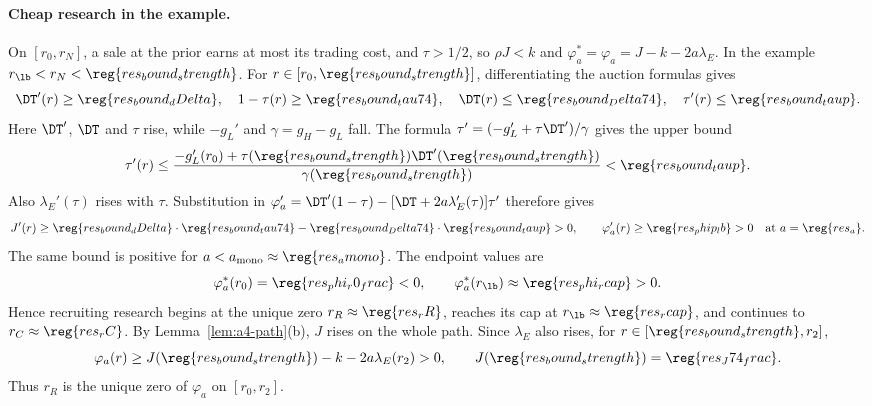 \paragraph{Cheap research in the example.}
On \([r_0,r_N]\), a sale at the prior earns at most its trading cost, and \(\tau>1/2\), so \(\rho J<k\) and
\(\varphi_a^*=\varphi_a=J-k-2a\lambda_E\). In the example \(r_{\lb}<r_N<\reg{res_bound_strength}\).
For \(r\in[r_0,\reg{res_bound_strength}]\), differentiating the auction formulas gives
\[
 \DT'(r)\ge\reg{res_bound_dDelta},\quad
 1-\tau(r)\ge\reg{res_bound_tau74},\quad
 \DT(r)\le\reg{res_bound_Delta74},\quad
 \tau'(r)\le\reg{res_bound_taup}.
\]
Here \(\DT'\), \(\DT\) and \(\tau\) rise, while \(-g_L'\) and \(\gamma=g_H-g_L\) fall. The formula
\(\tau'=(-g_L'+\tau\DT')/\gamma\) gives the upper bound
\[
 \tau'(r)\le
 \frac{-g_L'(r_0)+\tau(\reg{res_bound_strength})\DT'(\reg{res_bound_strength})}
 {\gamma(\reg{res_bound_strength})}
 <\reg{res_bound_taup}.
\]
Also \(\lambda_E'(\tau)\) rises with \(\tau\). Substitution in
\(\varphi_a'=\DT'(1-\tau)-[\DT+2a\lambda_E'(\tau)]\tau'\) therefore gives
\[
 J'(r)\ge \reg{res_bound_dDelta}\cdot\reg{res_bound_tau74}
 -\reg{res_bound_Delta74}\cdot\reg{res_bound_taup}>0,\qquad
 \varphi_a'(r)\ge\reg{res_phip_lb}>0
 \quad\text{at }a=\reg{res_a}.
\]
The same bound is positive for \(a<a_{\rm mono}\approx\reg{res_amono}\).
The endpoint values are
\[
 \varphi_a^*(r_0)=\reg{res_phi_r0_frac}<0,
 \qquad \varphi_a^*(r_{\lb})\approx\reg{res_phi_rcap}>0.
\]
Hence recruiting research begins at the unique zero \(r_R\approx\reg{res_rR}\), reaches its cap at
\(r_{\lb}\approx\reg{res_rcap}\), and continues to \(r_C\approx\reg{res_rC}\).
By Lemma~\ref{lem:a4-path}(b), \(J\) rises on the whole path. Since \(\lambda_E\) also rises, for
\(r\in[\reg{res_bound_strength},r_2]\),
\[
 \varphi_a(r)\ge J(\reg{res_bound_strength})-k-2a\lambda_E(r_2)>0,
 \qquad J(\reg{res_bound_strength})=\reg{res_J74_frac}.
\]
Thus \(r_R\) is the unique zero of \(\varphi_a\) on \([r_0,r_2]\).
